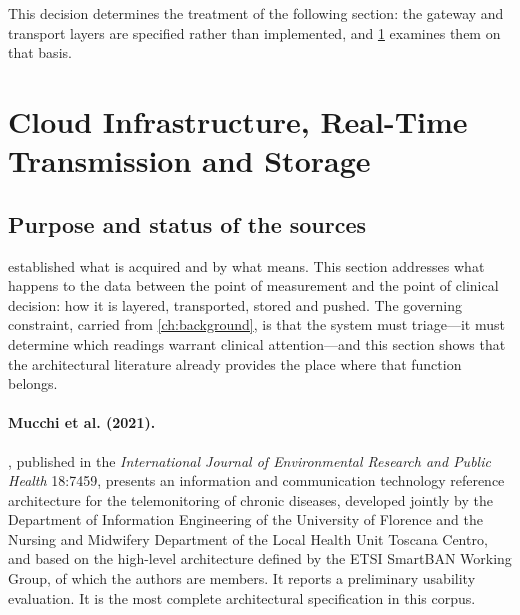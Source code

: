 \documentclass[12pt,a4paper,oneside]{report}
\begin{document}

This decision determines the treatment of the following section: the gateway and transport layers are specified rather than implemented, and \cref{sec:cloud} examines them on that basis.

\section{Cloud Infrastructure, Real-Time Transmission and Storage}\label{sec:cloud}

\subsection*{Purpose and status of the sources}

 established what is acquired and by what means. This section addresses what happens to the data between the point of measurement and the point of clinical decision: how it is layered, transported, stored and pushed. The governing constraint, carried from \cref{ch:background}, is that the system must triage---it must determine which readings warrant clinical attention---and this section shows that the architectural literature already provides the place where that function belongs.

\paragraph{Mucchi et al. (2021).} \textcite{mucchi2021}, published in the \emph{International Journal of Environmental Research and Public Health} 18:7459, presents an information and communication technology reference architecture for the telemonitoring of chronic diseases, developed jointly by the Department of Information Engineering of the University of Florence and the Nursing and Midwifery Department of the Local Health Unit Toscana Centro, and based on the high-level architecture defined by the ETSI SmartBAN Working Group, of which the authors are members. It reports a preliminary usability evaluation. It is the most complete architectural specification in this corpus.
\end{document}

